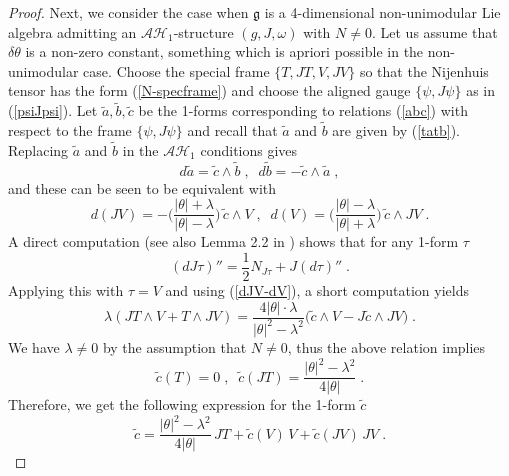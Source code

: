 \documentclass{amsart}
\begin{document}
\begin{proof}
 Next, we consider the case when $\mathfrak{g}$ is a 4-dimensional non-unimodular Lie algebra admitting an $\mathcal{AH}_1$-structure $(g, J, \omega)$ with $N\neq 0$. Let us assume that $\delta \theta $ is a non-zero constant, something which is apriori possible in the non-unimodular case.
 Choose the special frame $\{ T, JT, V, JV\}$ so that the Nijenhuis tensor has the form (\ref{N-specframe}) and choose the aligned gauge $\{ \psi, J \psi \}$ as in (\ref{psiJpsi}). Let $\tilde{a}, \tilde{b}, \tilde{c} $ be the 1-forms corresponding to relations (\ref{abc}) with respect to the frame $\{ \psi, J\psi \}$ and recall that $\tilde{a}$ and $\tilde{b}$ are given by (\ref{tatb}). Replacing $\tilde{a}$ and $\tilde{b}$ in the $\mathcal{AH}_1$ conditions gives
 $$ d \tilde{a} = \tilde{c} \wedge \tilde{b} \; , \; \; d \tilde{b} = -\tilde{c} \wedge \tilde{a} \; ,$$
 and these can be seen to be equivalent with
 \begin{equation} \label{dJV-dV}
 d(JV) = -\Big(\frac{|\theta| + \lambda}{|\theta| - \lambda} \Big) \, \tilde{c} \wedge V \; , \; \; d(V) = \Big(\frac{|\theta| - \lambda}{|\theta| + \lambda} \Big) \, \tilde{c} \wedge JV \; .     
 \end{equation}
 A direct computation (see also Lemma 2.2 in \cite{DS}) shows that for any 1-form $\tau$
 $$ (dJ\tau)'' = \frac{1}{2} N_{J\tau} + J(d\tau)'' \; .$$
 Applying this with $\tau = V$ and using (\ref{dJV-dV}), a short computation yields
 $$\lambda(JT \wedge V + T \wedge JV) = \frac{4|\theta| \cdot \lambda}{|\theta|^2 - \lambda^2} \big(\tilde{c} \wedge V - J \tilde{c} \wedge JV \big) \; .$$
 We have $\lambda \neq 0$ by the assumption that $N \neq 0$, thus the above relation implies
 \begin{equation} \label{tildecT} \nonumber
 \tilde{c}(T) = 0 \; , \; \; \tilde{c}(JT) = \frac{|\theta|^2 - \lambda^2}{4|\theta|} \; .
 \end{equation}
Therefore, we get the following expression for the 1-form $\tilde{c}$
\begin{equation} \label{tc} \nonumber
\tilde{c} = \frac{|\theta|^2 - \lambda^2}{4|\theta|} \, JT + \tilde{c}(V) \, V + \tilde{c}(JV) \, JV \; .    

\end{equation}
\end{proof}
\end{document}
